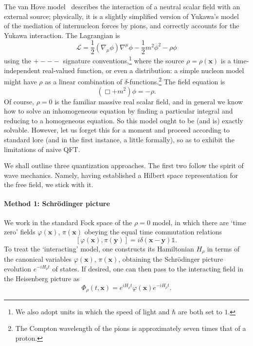 \documentclass[12pt]{article}
\newcommand{\1}{\mathds{1}}                         %
\newcommand{\xb}{{\boldsymbol{x}}}
\newcommand{\yb}{{\boldsymbol{y}}}
\begin{document}
	The van Hove model~\cite{vanHove:1952} describes the interaction of a neutral scalar field with an external source; physically, it is a slightly simplified version of Yukawa's model~\cite{Yukawa:1935} of the mediation of
	internucleon forces by pions, and correctly accounts for the Yukawa interaction. The Lagrangian is
	\[
	\mathcal{L} =\frac{1}{2}(\nabla_\mu\phi)\nabla^\mu\phi - \frac{1}{2}m^2\phi^2
	-\rho\phi
	\]
	using the ${+}{-}{-}{-}$ signature conventions,\footnote{We also adopt units in which the speed of light and $\hbar$ are both set to $1$.}
	where the source $\rho=\rho(\xb)$ is a time-independent real-valued function, or even a distribution: a simple nucleon model might have $\rho$ as a linear combination of $\delta$-functions.\footnote{The Compton wavelength of the pions is approximately seven times that of a proton.} The field equation is
	\begin{equation}\label{eq:vHeq}
	(\Box+m^2)\phi=-\rho.
	\end{equation}
	Of course, $\rho=0$ is the familiar massive real scalar field, and in general
	we know how to solve an inhomogeneous equation by finding a particular integral
	and reducing to a homogeneous equation. So this model ought to be (and is) exactly solvable. However, let us forget this for a moment and proceed according to standard lore (and in the first instance, a little formally), so as to exhibit the limitations of naive QFT. 
	
	We shall outline three quantization approaches. The first two follow the spirit of wave mechanics. Namely, having established a Hilbert space representation for the free field, we stick with it.
	\paragraph{Method 1: Schr\"odinger picture} We work in the standard Fock space of the $\rho=0$ model, in which there are `time zero' fields $\varphi(\xb)$, $\pi(\xb)$ obeying the equal time commutation relations
	\begin{equation}\label{eq:ETCR}
	[\varphi(\xb),\pi(\yb)]=i\delta(\xb-\yb)\mathbb{1}.
	\end{equation}
	To treat the `interacting' model, one constructs its Hamiltonian $H_\rho$ in terms of the  canonical variables $\varphi(\xb)$, $\pi(\xb)$, obtaining the Schr\"odinger picture evolution $e^{-iH_\rho t}$ of states. If desired, one can then pass to 
	the interacting field in the Heisenberg picture as 
	\[
	\Phi_\rho(t,\xb)=e^{iH_\rho t}\varphi(\xb)e^{-iH_\rho t}.
	\]
\end{document}
